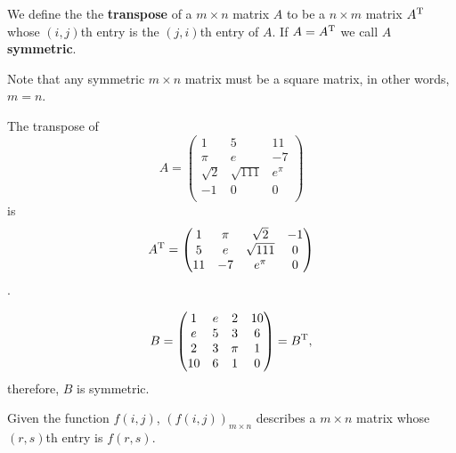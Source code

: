 \begin{definition}
    We define the the \textbf{transpose} of a $m\times n$ matrix $A$ to be a $n\times m$ matrix $A^{\rm T}$ whose $(i,j)$th entry is the $(j,i)$th entry of $A$. If $A=A^{\rm T}$ we call $A$ \textbf{symmetric}.
\end{definition}

\begin{remark}
    Note that any symmetric $m\times n$ matrix must be a square matrix, in other words, $m=n$.
\end{remark}

\begin{example}
    The transpose of 
    \[
        A=
        \begin{pmatrix}
            1&5&11\\
            \pi&e&-7\\
            \sqrt 2&\sqrt{111}&e^\pi\\
            -1&0&0\\
        \end{pmatrix}
    \]
    is
    \[
        A^{\rm T}=
        \begin{pmatrix}
            1&\pi&\sqrt 2&-1\\
            5&e&\sqrt{111}&0\\
            11&-7&e^\pi&0\\
        \end{pmatrix}
    \]
    .
\end{example}

\begin{example}
    \[
        B=
        \begin{pmatrix}
            1&e&2&10\\
            e&5&3&6\\
            2&3&\pi&1\\
            10&6&1&0\\
        \end{pmatrix}
        =B^{\rm T},
    \]
    therefore, $B$ is symmetric.
\end{example}

\begin{definition}
    Given the function $f(i,j)$, $(f(i,j))_{m\times n}$ describes a $m\times n$ matrix whose $(r,s)$th entry is $f(r,s)$.
\end{definition}


